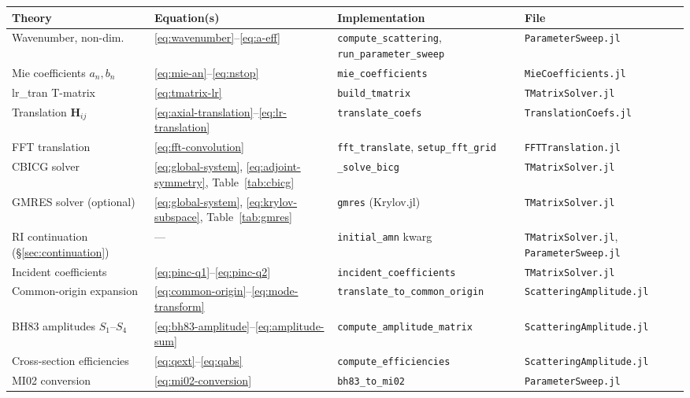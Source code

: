 \documentclass[11pt,a4paper]{article}
\begin{document}
\begin{center}
\begin{tabular}{@{} p{4.2cm} p{2.8cm} p{4.2cm} p{3.5cm} @{}}
  \toprule
  Theory & Equation(s) & Implementation & File \\
  \midrule
  Wavenumber, non-dim. & \eqref{eq:wavenumber}--\eqref{eq:a-eff} & \texttt{compute\_scattering}, \texttt{run\_parameter\_sweep} & \texttt{ParameterSweep.jl} \\
  Mie coefficients $a_n, b_n$ & \eqref{eq:mie-an}--\eqref{eq:nstop} & \texttt{mie\_coefficients} & \texttt{MieCoefficients.jl} \\
  lr\_tran T-matrix & \eqref{eq:tmatrix-lr} & \texttt{build\_tmatrix} & \texttt{TMatrixSolver.jl} \\
  Translation $\mathbf{H}_{ij}$ & \eqref{eq:axial-translation}--\eqref{eq:lr-translation} & \texttt{translate\_coefs} & \texttt{TranslationCoefs.jl} \\
  FFT translation & \eqref{eq:fft-convolution} & \texttt{fft\_translate}, \texttt{setup\_fft\_grid} & \texttt{FFTTranslation.jl} \\
  CBICG solver & \eqref{eq:global-system}, \eqref{eq:adjoint-symmetry}, Table~\ref{tab:cbicg} & \texttt{\_solve\_bicg} & \texttt{TMatrixSolver.jl} \\
  GMRES solver (optional) & \eqref{eq:global-system}, \eqref{eq:krylov-subspace}, Table~\ref{tab:gmres} & \texttt{gmres} (Krylov.jl) & \texttt{TMatrixSolver.jl} \\
  RI continuation (\S\ref{sec:continuation}) & --- & \texttt{initial\_amn} kwarg & \texttt{TMatrixSolver.jl}, \texttt{ParameterSweep.jl} \\
  Incident coefficients & \eqref{eq:pinc-q1}--\eqref{eq:pinc-q2} & \texttt{incident\_coefficients} & \texttt{TMatrixSolver.jl} \\
  Common-origin expansion & \eqref{eq:common-origin}--\eqref{eq:mode-transform} & \texttt{translate\_to\_common\_origin} & \texttt{ScatteringAmplitude.jl} \\
  BH83 amplitudes $S_1$--$S_4$ & \eqref{eq:bh83-amplitude}--\eqref{eq:amplitude-sum} & \texttt{compute\_amplitude\_matrix} & \texttt{ScatteringAmplitude.jl} \\
  Cross-section efficiencies & \eqref{eq:qext}--\eqref{eq:qabs} & \texttt{compute\_efficiencies} & \texttt{ScatteringAmplitude.jl} \\
  MI02 conversion & \eqref{eq:mi02-conversion} & \texttt{bh83\_to\_mi02} & \texttt{ParameterSweep.jl} \\

\end{tabular}
\end{center}
\end{document}

